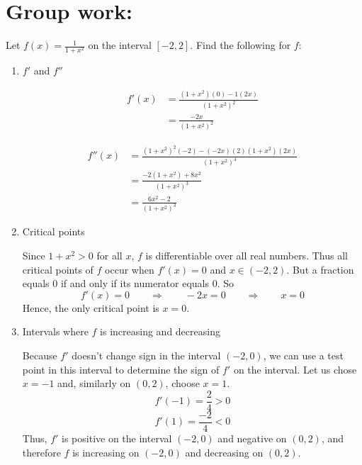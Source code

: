 \documentclass[nooutcomes]{ximera}
\begin{document}
	
	
	
	
	

\section*{Group work:}



\begin{problem}
Let $f(x) = \frac{1}{1 + x^2}$ on the interval $[-2,2]$.  Find the following for $f$:

	\begin{enumerate}
	
	\item  $f'$ and $f''$
	
		\begin{freeResponse}
			\begin{align*}
			f'(x) &= \frac{(1+x^2)(0) - 1(2x)}{(1+x^2)^2} \\
			&= \frac{-2x}{(1+x^2)^2}
			\end{align*}
			
			\begin{align*}
			f''(x) &= \frac{(1+x^2)^2(-2) - (-2x)(2)(1+x^2)(2x)}{(1+x^2)^4} \\
			&= \frac{-2(1+x^2) + 8x^2}{(1+x^2)^3} \\
			&= \frac{6x^2 - 2}{(1+x^2)^3}
			\end{align*}
		\end{freeResponse}
		
	\item  Critical points
	
		\begin{freeResponse}
		Since $1+x^2 > 0$ for all $x$, $f$ is differentiable over all real numbers.  Thus all critical points of $f$ occur when $f'(x) = 0$ and $x \in (-2,2)$.  But a fraction equals 0 if and only if its numerator equals 0.  So
		$$ f'(x) = 0 \qquad \Longrightarrow \qquad -2x = 0 \qquad \Longrightarrow \qquad x=0 $$
		Hence, the only critical point is $x=0$.  
		\end{freeResponse}
		
	\item  Intervals where $f$ is increasing and decreasing
	
		\begin{freeResponse}
		Because $f'$ doesn’t change sign in the interval $(-2,0)$, we can use a test point in this interval to determine the sign of $f'$ on the interval.  Let us chose $x=-1$ and, similarly on $(0,2)$, choose $x=1$.
		$$ f'(-1) = \frac{2}{4} > 0 $$
		$$ f'(1) = \frac{-2}{4} < 0 $$
		Thus, $f'$ is positive on the interval $(-2,0)$ and negative on $(0,2)$, and therefore $f$ is increasing on $(-2,0)$ and decreasing on $(0,2)$.  
		\end{freeResponse}
		

\end{enumerate}
\end{problem}
\end{document}
